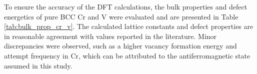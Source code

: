 \documentclass[preprint,12pt]{elsarticle}
\begin{document}
To ensure the accuracy of the DFT calculations, the bulk properties and defect energetics of pure BCC Cr and V were evaluated and are presented in Table \ref{tab:bulk_prop_cr_v}. The calculated lattice constants and defect properties are in reasonable agreement with values reported in the literature. Minor discrepancies were observed, such as a higher vacancy formation energy and attempt frequency in Cr, which can be attributed to the antiferromagnetic state assumed in this study. 


\begin{table}[]
    \centering
    \caption{The lattice constants and the defect properties in BCC Cr and V are presented in comparison to previous results in the literature \citep{yang_significant_2023,nguyen_bcc_2006,SHANG2016128,BOEV201714,fattahpour_understanding_2022, DENG201655}}
    \setlength{\tabcolsep}{7.5pt} %
    \renewcommand{\arraystretch}{1.25} %
\end{table}
\end{document}
